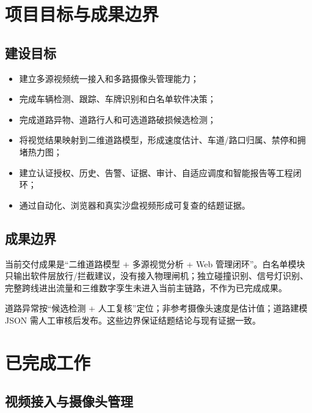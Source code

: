 \section{项目目标与成果边界}\label{summary-ux9879ux76eeux76eeux6807ux4e0eux6210ux679cux8fb9ux754c}

\subsection{建设目标}\label{summary-ux5efaux8bbeux76eeux6807}

\begin{itemize}
\tightlist
\item
  建立多源视频统一接入和多路摄像头管理能力；
\item
  完成车辆检测、跟踪、车牌识别和白名单软件决策；
\item
  完成道路异物、道路行人和可选道路破损候选检测；
\item
  将视觉结果映射到二维道路模型，形成速度估计、车道/路口归属、禁停和拥堵热力图；
\item
  建立认证授权、历史、告警、证据、审计、自适应调度和智能报告等工程闭环；
\item
  通过自动化、浏览器和真实沙盘视频形成可复查的结题证据。
\end{itemize}

\subsection{成果边界}\label{summary-ux6210ux679cux8fb9ux754c}

当前交付成果是``二维道路模型 + 多源视觉分析 + Web 管理闭环''。白名单模块只输出软件层放行/拦截建议，没有接入物理闸机；独立碰撞识别、信号灯识别、完整跨线进出流量和三维数字孪生未进入当前主链路，不作为已完成成果。

道路异常按``候选检测 + 人工复核''定位；非参考摄像头速度是估计值；道路建模 JSON 需人工审核后发布。这些边界保证结题结论与现有证据一致。

\section{已完成工作}\label{summary-ux5df2ux5b8cux6210ux5de5ux4f5c}

\subsection{视频接入与摄像头管理}\label{summary-ux89c6ux9891ux63a5ux5165ux4e0eux6444ux50cfux5934ux7ba1ux7406}

